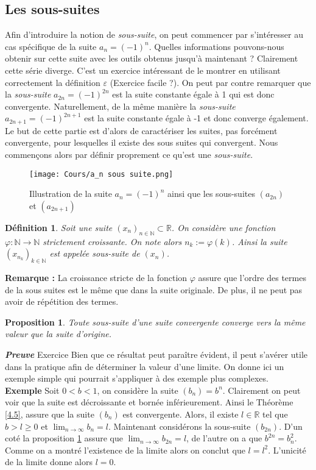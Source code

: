 \documentclass[a4paper, 12pt, french, twoside]{article}
\newtheorem{proposition}[theorem]{Proposition}
\newtheorem{defi}[theorem]{Définition}
\newcommand{\Nn}{{\mathbb{N}}}
\newcommand{\Rr}{{\mathbb{R}}}
\begin{document}
\subsection{Les sous-suites}
Afin d'introduire la notion de \textit{sous-suite}, on peut commencer par s'intéresser au cas spécifique de la suite $a_n = (-1)^n$. Quelles informations pouvons-nous obtenir sur cette suite avec les outils obtenus jusqu'à maintenant ? 
Clairement cette série diverge. C'est un exercice intéressant de le montrer en utilisant correctement la définition $\varepsilon$ (Exercice facile ?). On peut par contre remarquer que la \textit{sous-suite} $a_{2n} = (-1)^{2n}$ est la suite constante égale à 1 qui est donc convergente. Naturellement, de la même manière la \textit{sous-suite} $a_{2n+1} = (-1)^{2n+1}$ est la suite constante égale à -1 et donc converge également. Le but de cette partie est d'alors de caractériser les suites, pas forcément convergente, pour lesquelles il existe des sous suites qui convergent. Nous commençons alors par définir proprement ce qu'est une \textit{sous-suite}.
\begin{figure}[H]
    \centering
    \texttt{[image: Cours/a\_n sous suite.png]}
    \caption{Illustration de la suite $a_n = (-1)^n$ ainsi que les sous-suites $(a_{2n})$ et $(a_{2n+1})$ }
    \label{fig:enter-label}
\end{figure}

\begin{defi}
 Soit une suite $(x_n)_{ n \in \Nn } \subset \Rr $. On considère une fonction $\varphi : \Nn \rightarrow \Nn $ strictement croissante. On note alors $n_k := \varphi(k)$. Ainsi la suite $(x_{n_k})_{k \in \Nn} $ est appelée \textit{sous-suite} de  $(x_n)$. 
 \end{defi}
 
\textbf{Remarque :} La croissance stricte de la fonction $\varphi$ assure que l'ordre des termes de la sous suites est le même que dans la suite originale. De plus, il ne peut pas avoir de répétition des termes. 


\begin{proposition}\label{2}
    Toute sous-suite d'une suite convergente converge vers la même valeur que la suite d'origine.  
\end{proposition}
\textit{\textbf{Preuve}} Exercice 
\newline 
Bien que ce résultat peut paraître évident, il peut s'avérer utile dans la pratique afin de déterminer la valeur d'une limite. On donne ici un exemple simple qui pourrait s'appliquer à des exemple plus complexes.\newline \\
\textbf{Exemple} Soit $0<b<1$, on considère la suite $(b_n) = b^n$. Clairement on peut voir que la suite est décroissante et bornée inférieurement. Ainsi le Théorème \ref{4.5}, assure que la suite $(b_n)$ est convergente. Alors, il existe  $l \in \Rr$ tel que $b > l \ge 0$ et $\lim_{n \to \infty} b_n = l$. Maintenant considérons la sous-suite $(b_{2n})$. D'un coté la proposition \ref{2} assure que $\lim_{n \to \infty} b_{2n} = l$, de l'autre on a que $b^{2n} = b_n^2$. Comme on a montré l'existence de la limite alors on conclut que $l = l^2$. L'unicité de la limite donne alors $l=0$. \\
\end{document}
